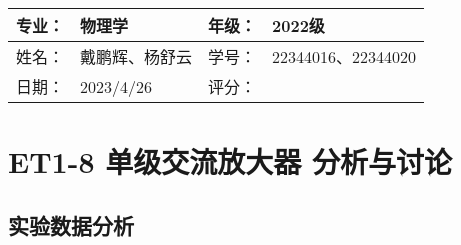 \documentclass[dvipsnames, svgnames,a4paper,11pt]{article}
\begin{document}
	
	
	
	\clearpage
	
	\begin{table}
		\renewcommand\arraystretch{1.7}
		\begin{tabularx}{\textwidth}{|X|X|X|X|}
			\hline
			专业：& 物理学 &年级：& 2022级\\
			\hline
			姓名： & 戴鹏辉、杨舒云 & 学号：& 22344016、22344020\\
			\hline
			日期：& 2023/4/26 & 评分： &\\
			\hline
		\end{tabularx}
	\end{table}
	
	\section{ET1-8 单级交流放大器 \quad\heiti 分析与讨论}
	
	\subsection{实验数据分析}
	
\end{document}
